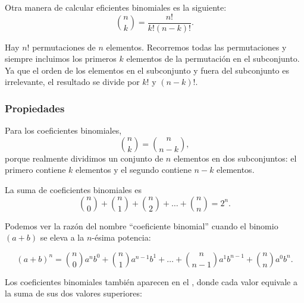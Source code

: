 Otra manera de calcular eficientes binomiales es la siguiente:
\[
    \binom{n}{k}  =  \frac{n!}{k!(n-k)!}.
\]

Hay $n!$ permutaciones de $n$ elementos. Recorremos todas las permutaciones y
siempre incluimos los primeros $k$ elementos de la permutación en el
subconjunto. Ya que el orden de los elementos en el subconjunto y fuera del
subconjunto es irrelevante, el resultado se divide por $k!$ y $(n-k)!$.

\subsubsection{Propiedades}

Para los coeficientes binomiales,
\[
    \binom{n}{k}  =  \binom{n}{n-k},
\]
porque realmente dividimos un conjunto de $n$ elementos en dos subconjuntos:
el primero contiene $k$ elementos y el segundo contiene $n-k$ elementos.

La suma de coeficientes binomiales es
\[
    \binom{n}{0}+\binom{n}{1}+\binom{n}{2}+\ldots+\binom{n}{n}=2^n.
\]

Podemos ver la razón del nombre ``coeficiente binomial'' cuando el binomio
$(a+b)$ se eleva a la $n$-ésima potencia:

\[ (a+b)^n =
    \binom{n}{0} a^n b^0 +
    \binom{n}{1} a^{n-1} b^1 +
    \ldots +
    \binom{n}{n-1} a^1 b^{n-1} +
    \binom{n}{n} a^0 b^n. \]


Los coeficientes binomiales también aparecen en el ,
donde cada valor equivale a la suma de sus dos valores superiores:
\begin{center}
\end{center}

